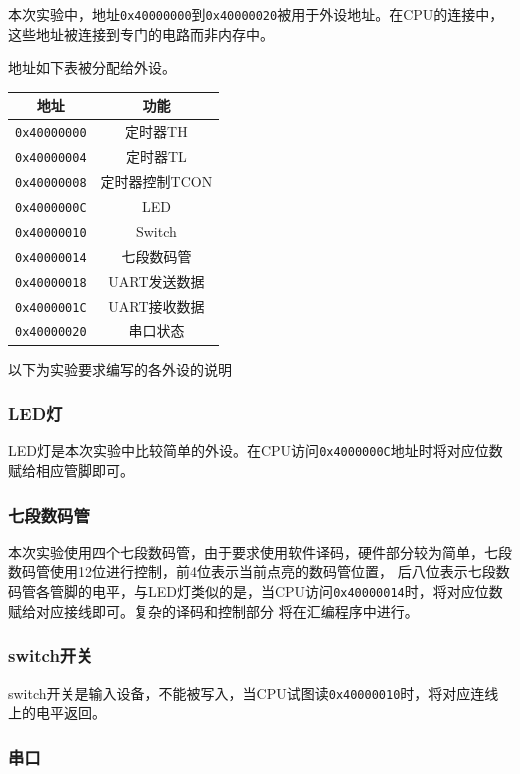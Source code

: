 \documentclass{ctexart}
\begin{document}
		本次实验中，地址\verb"0x40000000"到\verb"0x40000020"被用于外设地址。在CPU的连接中，这些地址被连接到专门的电路而非内存中。

		地址如下表被分配给外设。

		\begin{table}[ht]
			\centering
			\begin{tabular}{|c|c|}
				\hline
				地址 & 功能  \\
				\hline
				\verb"0x40000000" & 定时器TH \\
				\verb"0x40000004" & 定时器TL \\
				\verb"0x40000008" & 定时器控制TCON \\
				\verb"0x4000000C" & LED \\
				\verb"0x40000010" & Switch \\
				\verb"0x40000014" & 七段数码管 \\
				\verb"0x40000018" & UART发送数据 \\
				\verb"0x4000001C" & UART接收数据 \\
				\verb"0x40000020" & 串口状态 \\ 
				\hline
			\end{tabular}
		\end{table}


以下为实验要求编写的各外设的说明

			\subsubsection{LED灯}
			LED灯是本次实验中比较简单的外设。在CPU访问\verb"0x4000000C"地址时将对应位数赋给相应管脚即可。
			\subsubsection{七段数码管}
			本次实验使用四个七段数码管，由于要求使用软件译码，硬件部分较为简单，七段数码管使用12位进行控制，前4位表示当前点亮的数码管位置，
			后八位表示七段数码管各管脚的电平，与LED灯类似的是，当CPU访问\verb"0x40000014"时，将对应位数赋给对应接线即可。复杂的译码和控制部分
			将在汇编程序中进行。
			\subsubsection{switch开关}
			switch开关是输入设备，不能被写入，当CPU试图读\verb"0x40000010"时，将对应连线上的电平返回。
			\subsubsection{串口}
			
\end{document}

